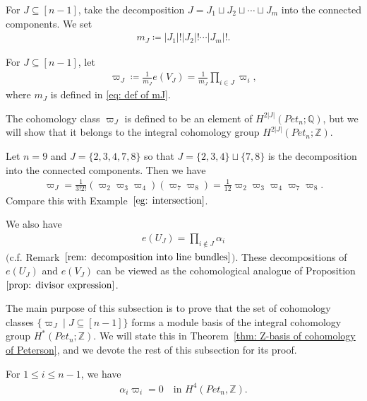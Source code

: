 For $J\subseteq[n-1]$, take the decomposition $J = J_1 \sqcup J_2 \sqcup \cdots \sqcup J_{m}$ into the connected components. We set 
\begin{align}\label{eq: def of mJ}
m_J \coloneqq |J_1| ! |J_2| ! \cdots |J_m| !.
\end{align}

\begin{defi} \label{defi:varpi}
For $J\subseteq[n-1]$, let
\begin{align*}
 \varpi_J \coloneqq \frac{1}{m_J} 
 e(V_J)= \frac{1}{m_J} \prod_{i\in J} \varpi_i ,
\end{align*}
where $m_J$ is defined in \eqref{eq: def of mJ}.
\end{defi}

The cohomology class $\varpi_J$ is defined to be an element of $H^{2|J|}(Pet_{n};{\mathbb Q})$, but we will show that it belongs to the integral cohomology group $H^{2|J|}(Pet_{n};{\mathbb Z})$.

\begin{exam}
{\rm 
Let $n=9$ and $J=\{2,3,4,7,8\}$ so that $J=\{2,3,4\}\sqcup\{7,8\}$ is the decomposition into the connected components. Then we have 
\begin{align*}
 \varpi_J 
 = \frac{1}{3!2!}(\varpi_2\varpi_3\varpi_4)(\varpi_7\varpi_8)
 =\frac{1}{12}\varpi_2\varpi_3\varpi_4\varpi_7\varpi_8 .
\end{align*}
Compare this with Example~$\ref{eg: intersection}$.}
\end{exam}

\begin{rema}
We also have 
\begin{align*}
e(U_J) = \prod_{i\notin J} \alpha_i 
\end{align*}
$($c.f. Remark~$\ref{rem: decomposition into line bundles}$$)$. These decompositions of $e(U_J)$ and $e(V_J)$ can be viewed as the cohomological analogue of Proposition $\ref{prop: divisor expression}$. 
\end{rema}

The main purpose of this subsection is to prove that the set of cohomology classes $\{\varpi_J \mid J\subseteq[n-1]\}$ forms a module basis of the integral cohomology group $H^*(Pet_{n};{\mathbb Z})$. We will state this in Theorem~\ref{thm: Z-basis of cohomology of Peterson}, and we devote the rest of this subsection for its proof.

\begin{lemma}\label{lem: vanishing product}
For $1\le i\le n-1$, we have 
\begin{align*}
\alpha_i \varpi_i = 0 \quad \text{in $H^4(Pet_{n},{\mathbb Z})$}.
\end{align*}
\end{lemma}

